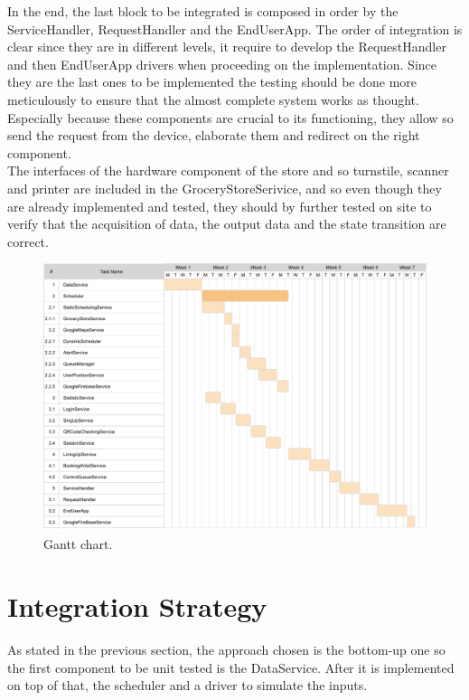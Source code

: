 In the end, the last block to be integrated is composed in order by the ServiceHandler, RequestHandler and the EndUserApp. The order of integration is clear since they are in different levels, it require to develop the RequestHandler and then EndUserApp drivers when proceeding on the implementation. 
Since they are the last ones to be implemented the testing should be done more meticulously to ensure that the almost complete system works as thought. Especially because these components are crucial to its functioning, they allow so send the request from the device, elaborate them and redirect on the right component.\\
The interfaces of the hardware component of the store and so turnstile, scanner and printer are included in the GroceryStoreSerivice, and so even though they are already implemented and tested, they should by further tested on site to verify that the acquisition of data, the output data and the state transition are correct. 
\begin{figure}[H]
    \centering
    \includegraphics[width=1.0\textwidth]{images/Gantt.pdf}
    \caption{Gantt chart.}
\end{figure}

\section{Integration Strategy}

As stated in the previous section, the approach chosen is the bottom-up one so the first component to be unit tested is the DataService. After it is implemented on top of that, the scheduler and a driver to simulate the inputs.

